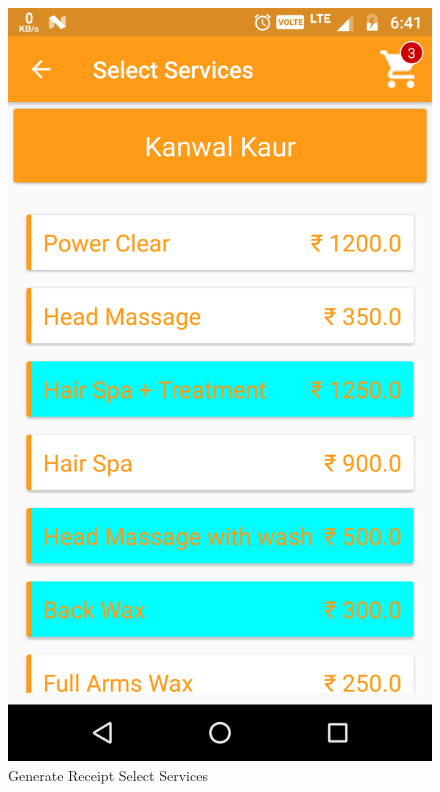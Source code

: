 \\
\begin{figure}[h]
	\centering
	\includegraphics[width=0.7\linewidth]{GenerateReceiptSelectServices}
	\caption{Generate Receipt Select Services}
\end{figure}
\pagebreak

